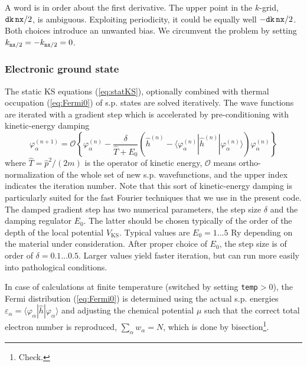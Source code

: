 \documentclass[final,1p]{elsarticle}
\newcommand{\PGRfoot}[1]{{\color{blue}\footnote{\color{blue} #1}}}
\begin{document}
A word is in order about the first derivative. The upper point in the
$k$-grid, ${\tt dk}\,{\tt nx}/2$, is ambiguous. Exploiting periodicity,
it could be equally well $-{\tt dk}\,{\tt nx}/2$. 
Both choices introduce an unwanted bias. 
We circumvent the problem by setting 
$k_{{\tt nx}/2}=-k_{{\tt nx}/2}=0$. 





\subsubsection{Electronic ground state}
\label{sec:numstaticel}


The static KS equations (\ref{eq:statKS}), optionally combined with
thermal occupation (\ref{eq:Fermi0}) of s.p. states are solved
iteratively. The wave functions are iterated with a gradient step
which is accelerated by pre-conditioning with kinetic-energy
damping~\cite{Rei82a,Blu92}
\begin{equation}
  \varphi_\alpha^{(n+1)}
  =
  \mathcal{O}\left\{
    \varphi_\alpha^{(n)} 
    - 
    \frac{\delta}{\hat{T} + E_0} 
    \left( \hat{h}^{(n)} - 
      \langle\varphi_\alpha^{(n)}|\hat{h}^{(n)}|\varphi_\alpha^{(n)}\rangle
    \right)\varphi_\alpha^{(n)}\right\}
  \label{eq:dampstep}
\end{equation}
where $\hat{T}=\hat{p}^2/(2m)$ is the operator of kinetic energy,
$\mathcal{O}$ means ortho-normalization of the whole set of new
s.p. wavefunctions, and the upper index indicates the iteration
number.  Note that this sort of kinetic-energy damping is particularly
suited for the fast Fourier techniques that we use in the present
code.  The damped gradient step has two numerical parameters, the step
size $\delta$ and the damping regulator $E_0$. The latter should be
chosen typically of the order of the depth of the local potential
$V_\mathrm{KS}$. Typical values are $E_0=1...5$ Ry depending on the
material under consideration. After proper choice of $E_0$, the step
size is of order of $\delta=0.1...0.5$. Larger values yield faster
iteration, but can run more easily into pathological conditions.


In case of calculations at finite temperature (switched by setting
{\tt temp}$>0$), the Fermi distribution (\ref{eq:Fermi0}) is
determined using the actual s.p. energies
$\varepsilon_\alpha=\langle\varphi_\alpha|\hat{h}|\varphi_\alpha\rangle$
and adjusting the chemical potential $\mu$ such that the correct total
electron number is reproduced, $\sum_\alpha w_\alpha=N$, which is done
by bisection\PGRfoot{Check.}.
\end{document}

